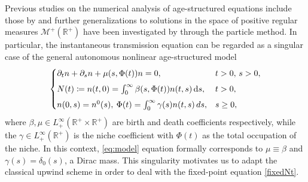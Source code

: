 \documentclass[11pt,a4paper]{article}
\newcommand{\R}{\mathbb{R}}
\newcommand{\dd}{\mathrm{d}}
\begin{document}
Previous studies on the numerical analysis of age-structured equations include those by 
\cite{lopez1991upwind,sulsky1994numerical,abia2005age,iannelli2017basic} and further generalizations to solutions in the space of positive regular measures $\mathcal{M}^+(\R^+)$ have been investigated by \cite{carrillo2014splitting,gwiazda2010nonlinear,ackleh2019finite} through the particle method. In particular, the instantaneous transmission equation can be regarded as a singular case of the general autonomous nonlinear age-structured model
\begin{equation}
  \begin{cases}
\partial_t n+\partial_s n+\mu(s,\Phi(t))n=0,&t>0,\,s>0,\vspace{0.15cm}\\
N(t)\coloneqq n(t,0)=\int_0^\infty \beta(s,\Phi(t))n(t,s)\,\dd s,&t>0,\vspace{0.15cm}\\
n(0,s)=n^0(s),\:\Phi(t)=\int_0^\infty\gamma(s)n(t,s)\,ds, & s\ge 0,   
\end{cases}  
\end{equation}
where $\beta,\mu\in L_+^\infty(\R^+\times\R^+)$ are birth and death coefficients respectively, while the $\gamma\in L_+^\infty(\R^+)$ is the niche coefficient with $\Phi(t)$ as the total occupation of the niche. In this context, \eqref{eq:model} equation formally corresponds to $\mu\equiv\beta$ and $\gamma(s)=\delta_0(s)$, a Dirac mass. This singularity motivates us to adapt the classical upwind scheme in order to deal with the fixed-point equation \eqref{fixedNt}.
\end{document}
